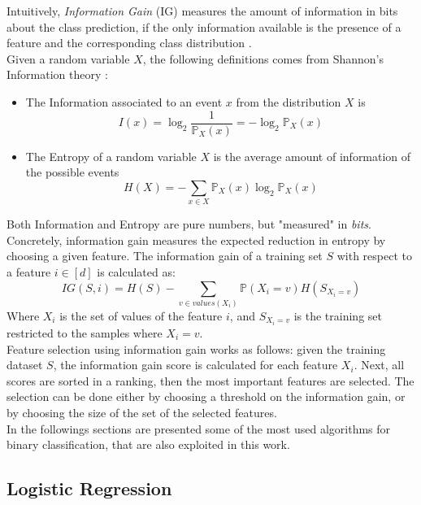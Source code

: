 Intuitively, \textit{Information Gain} (IG) measures the amount of information in bits about the class prediction, if the only information available is the presence of a feature and the corresponding class distribution \cite{Roobaert_chapter22}.\\
Given a random variable $X$, the following definitions comes from Shannon's Information theory \cite{Shannon1948}:
\begin{itemize}
	\item The Information associated to an event $x$ from the distribution $X$ is
	\[ I(x) = \log_2 \frac{1}{\mathbb{P}_X(x)} = - \log_2 \mathbb{P}_X(x) \]
	\item The Entropy of a random variable $X$ is the average amount of information of the possible events
	\[ H(X) = - \sum_{x \in X} \mathbb{P}_X(x) \log_2 \mathbb{P}_X(x) \]
\end{itemize}

Both Information and Entropy are pure numbers, but "measured" in \textit{bits}.\\
Concretely, information gain measures the expected reduction in entropy by choosing a given feature. The information gain of a training set $S$ with respect to a feature $i \in [d]$ is calculated as:
\[ IG(S, i) = H(S) - \sum_{v \in values(X_i)} \mathbb{P}(X_i = v) H(S_{X_i=v}) \]
Where $X_i$ is the set of values of the feature $i$, and $S_{X_i=v}$ is the training set restricted to the samples where $X_i=v$.\\
Feature selection using information gain works as follows: given the training dataset $S$, the information gain score is calculated for each feature $X_i$. Next, all scores are sorted in a ranking, then the most important features are selected. The selection can be done either by choosing a threshold on the information gain, or by choosing the size of the set of the selected features.\\



In the followings sections are presented some of the most used algorithms for binary classification, that are also exploited in this work.


\subsection{Logistic Regression}

